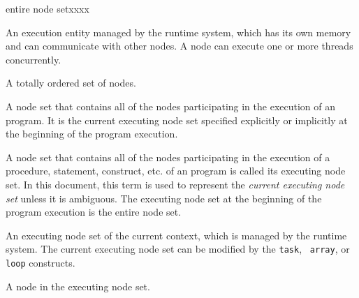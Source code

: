 \begin{namelist}{entire node setxxxx}

%



 An execution entity managed by the {\XMP} runtime system, which has its
 own memory and can communicate with other nodes. A node can execute one
 or more threads concurrently.

%


 A totally ordered set of nodes.


 A node set that contains all of the nodes participating in the
 execution of an {\XMP} program.
 It is the current executing node set specified explicitly or 
 implicitly at the beginning of the program execution. 


 A node set that contains all of the nodes participating in the
 execution of a procedure, statement, construct, etc. of an
 {\XMP} program is called its executing node set.
%
 In this document, this term is used to represent the {\it current
 executing node set} unless it is ambiguous.
%
 The executing node set at the beginning of the program execution
 is the entire node set.


 An executing node set of the current context, which is managed by the
 {\XMP} runtime system.
%
 The current executing node set can be modified by the {\tt task}, {\tt
 array}, or {\tt loop} constructs. 


 A node in the executing node set.


\end{namelist}
